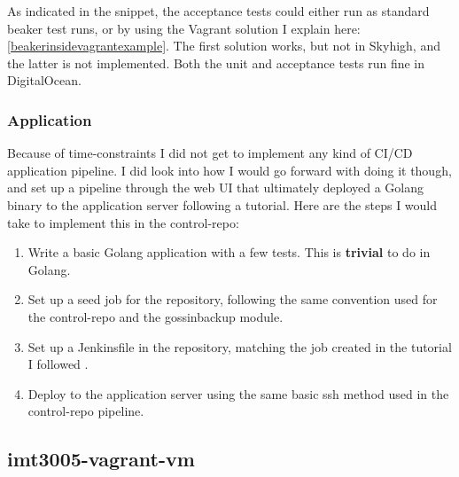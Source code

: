 As indicated in the snippet, the acceptance tests could either run as standard beaker test runs, or by using the Vagrant solution I explain here: \ref{beakerinsidevagrantexample}. The first solution works, but not in Skyhigh, and the latter is not implemented. Both the unit and acceptance tests run fine in DigitalOcean.

\subsubsection{Application} \label{applicationpipeline}

Because of time-constraints I did not get to implement any kind of CI/CD application pipeline. I did look into how I would go forward with doing it though, and set up a pipeline through the web UI that ultimately deployed a Golang\cite{golang} binary to the application server following a tutorial\cite{buidonjenkinsandpublishwithpipelines}. Here are the steps I would take to implement this in the control-repo:

\begin{enumerate}
\item Write a basic Golang application with a few tests. This is \textbf{trivial} to do in Golang.
\item Set up a seed job for the repository, following the same convention used for the control-repo and the gossinbackup module.
\item Set up a Jenkinsfile in the repository, matching the job created in the tutorial I followed \cite{buidonjenkinsandpublishwithpipelines}.
\item Deploy to the application server using the same basic ssh method used in the control-repo pipeline.
\end{enumerate}

\subsection{imt3005-vagrant-vm}

